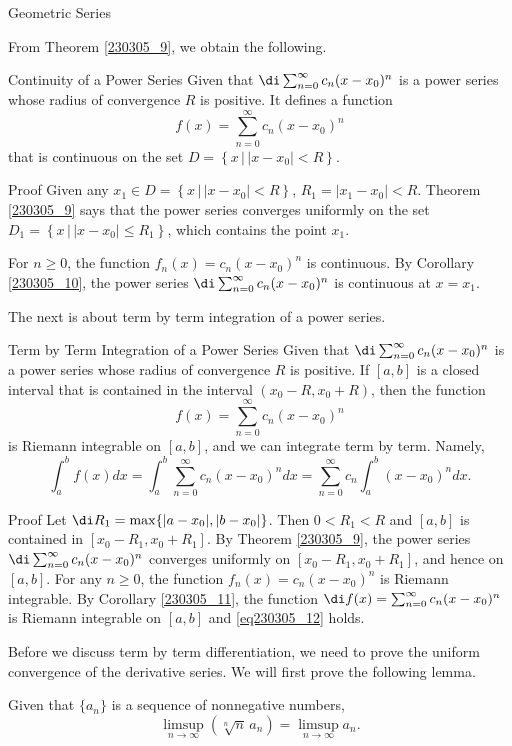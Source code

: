 \begin{example}[label=230305_16]{Geometric Series}
\begin{example}[label=230304_9]{}
 From Theorem \ref{230305_9}, we obtain the following.
 \begin{theorem}{Continuity of a Power Series}
Given that   $\di \sum_{n=0}^{\infty}c_n(x-x_0)^n$ is a power series whose radius of convergence $R$ is positive.  It defines a function 
\[f(x)=\sum_{n=0}^{\infty}c_n(x-x_0)^n\] that is continuous on the set $D=\left\{ x\,|\,|x-x_0|< R \right\}$.
\end{theorem}
\begin{myproof}{Proof}
Given any $x_1\in D=\left\{ x\,|\,|x-x_0|< R \right\}$, $R_1=|x_1-x_0|<R$.  Theorem \ref{230305_9} says that  the power series converges uniformly on the set  $D_1=\left\{ x\,|\,|x-x_0|\leq R_1 \right\}$, which contains the point $x_1$. 

 For $n\geq 0$,  the function $f_n(x)=c_n(x-x_0)^n$ is continuous. By Corollary \ref{230305_10}, the power series  $\di \sum_{n=0}^{\infty}c_n(x-x_0)^n$ is continuous at $x=x_1$.  
\end{myproof}

The next is about term by term integration of a power series.
 \begin{theorem}[label=230305_21]{Term by Term Integration of a Power Series}
Given that   $\di \sum_{n=0}^{\infty}c_n(x-x_0)^n$ is a power series whose radius of convergence $R$ is positive. If $[a,b]$ is a closed interval that is contained in the interval $(x_0-R,x_0+R)$, then the function
\[f(x)=\sum_{n=0}^{\infty}c_n(x-x_0)^n\] is Riemann integrable on $[a,b]$, and
we can integrate  term by term. Namely,
\begin{equation}\label{eq230305_12}\int_a^bf(x)dx=\int_a^b\sum_{n=0}^{\infty}c_n(x-x_0)^ndx=\sum_{n=0}^{\infty}c_n\int_a^b (x-x_0)^ndx.\end{equation}
\end{theorem}
\begin{myproof}{Proof}
Let $\di R_1=\max\{|a-x_0|, |b-x_0|\}$. Then $0<R_1<R$ and $[a,b]$ is contained in $[x_0-R_1, x_0+R_1]$. By 
  Theorem \ref{230305_9}, the power series $\di \sum_{n=0}^{\infty}c_n(x-x_0)^n$ converges uniformly on  $[x_0-R_1, x_0+R_1]$, and hence on $[a,b]$. 
    For any $n\geq 0$,  the function $f_n(x)=c_n(x-x_0)^n$ is Riemann integrable.
   By Corollary \ref{230305_11}, the function $\di f(x)= \sum_{n=0}^{\infty}c_n(x-x_0)^n$  is Riemann integrable on $[a,b]$ and \eqref{eq230305_12} holds.
\end{myproof}

Before we discuss term by term differentiation, we need to prove the uniform convergence of the derivative series. We will first prove the following lemma.
\begin{lemma}[label=230618_2]{}
Given that $\{a_n\}$ is a sequence of nonnegative numbers, 
\[\limsup_{n\to \infty}\left(\sqrt[n]{n}\, a_n\right)=\limsup_{n\to\infty}a_n.\]


\end{lemma}
\end{example}
\end{example}
